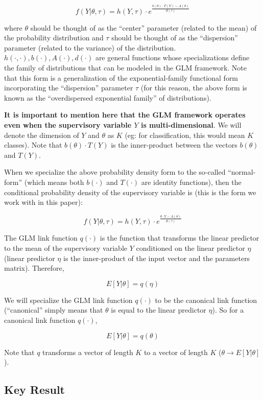 \documentclass[10pt]{amsart}
\begin{document}
$$f(Y | \theta, \tau) = h(Y, \tau) \cdot e^{\frac {b(\theta) \cdot T(Y) - A(\theta)} {d(\tau)}}$$

where $\theta$ should be thought of as the ``center'' parameter (related to the mean) of the probability distribution and $\tau$ should be thought of as the ``dispersion'' parameter (related to the variance) of the distribution. $h(\cdot, \cdot), b(\cdot), A(\cdot), d(\cdot)$ are general functions whose specializations define the family of distributions that can be modeled in the GLM framework. Note that this form is a generalization of the exponential-family functional form incorporating the ``dispersion'' parameter $\tau$ (for this reason, the above form is known as the ``overdispersed exponential family'' of distributions).

{\bf It is important to mention here that the GLM framework operates even when the supervisory variable $Y$ is multi-dimensional}. We will denote the dimension of $Y$ and $\theta$ as $K$ (eg: for classification, this would mean $K$ classes). Note that $b(\theta) \cdot T(Y)$ is the inner-product between the vectors $b(\theta)$ and $T(Y)$. 

When we specialize the above probability density form to the so-called ``normal-form'' (which means both $b(\cdot)$ and $T(\cdot)$ are identity functions), then the conditional probability density of the supervisory variable is (this is the form we work with in this paper):

$$f(Y | \theta, \tau) = h(Y, \tau) \cdot e^{\frac {\theta \cdot Y - A(\theta)} {d(\tau)}}$$

The GLM link function $q(\cdot)$ is the function that transforms the linear predictor to the mean of the supervisory variable $Y$ conditioned on the linear predictor $\eta$ (linear predictor $\eta$ is the inner-product of the input vector and the parameters matrix). Therefore,

$$E[Y|\theta] = q(\eta)$$

We will specialize the GLM link function $q(\cdot)$ to be the canonical link function (``canonical'' simply means that $\theta$ is equal to the linear predictor $\eta$). So for a canonical link function $q(\cdot)$,

$$E[Y|\theta] = q(\theta)$$

Note that $q$ transforms a vector of length $K$ to a vector of length $K$ ($\theta \rightarrow E[Y|\theta]$).

\subsection{Key Result}
\end{document}
